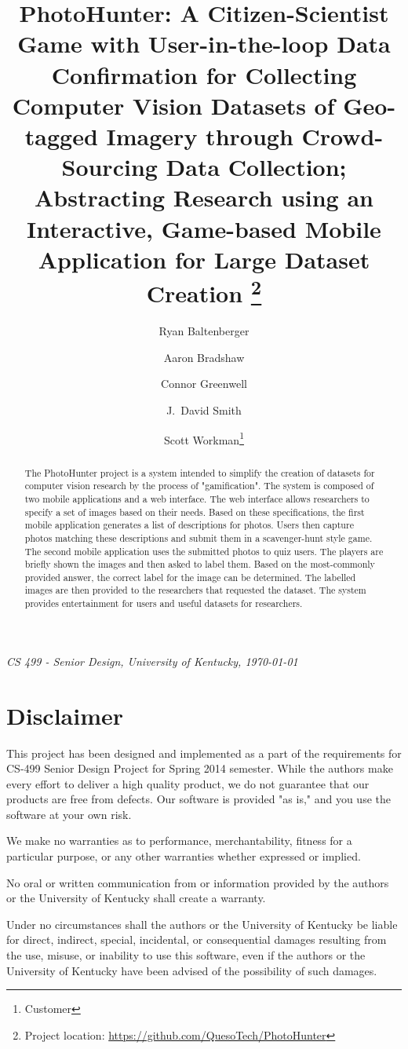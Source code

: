 \documentclass{article}
\title{PhotoHunter: A Citizen-Scientist Game with User-in-the-loop
  Data Confirmation for Collecting Computer Vision Datasets of
  Geo-tagged Imagery through Crowd-Sourcing Data Collection; Abstracting
  Research using an Interactive, Game-based Mobile Application for Large
  Dataset Creation
  \footnote{Project location:
    \url{https://github.com/QuesoTech/PhotoHunter}
  }
}
\author{
	Ryan Baltenberger \and
	Aaron Bradshaw \and
	Connor Greenwell \and
	J.\ David Smith \and
	Scott Workman\footnote{Customer}
}
\date{}
\begin{document}
\maketitle

\begin{center}
  \textit{CS 499 - Senior Design, University of Kentucky, \today}
\end{center}

\begin{abstract}
  The PhotoHunter project is a system intended to simplify the creation of
  datasets for computer vision research by the process of "gamification". The
  system is composed of two mobile applications and a web interface. The web
  interface allows researchers to specify a set of images based on their needs.
  Based on these specifications, the first mobile application generates a list of
  descriptions for photos. Users then capture photos matching these descriptions
  and submit them in a scavenger-hunt style game. The second mobile application
  uses the submitted photos to quiz users. The players are briefly shown the
  images and then asked to label them. Based on the most-commonly provided
  answer, the correct label for the image can be determined. The labelled images
  are then provided to the researchers that requested the dataset. The system
  provides entertainment for users and useful datasets for researchers.
\end{abstract}

\section{Disclaimer}
This project has been designed and implemented as a part of the requirements
for CS-499 Senior Design Project for Spring 2014 semester.  While the authors
make every effort to deliver a high quality product, we do not guarantee that
our products are free from defects.  Our software is provided "as is," and you
use the software at your own risk.

We make no warranties as to performance, merchantability, fitness for a
particular purpose, or any other warranties whether expressed or implied.

No oral or written communication from or information provided by the authors or
the University of Kentucky shall create a warranty.

Under no circumstances shall the authors or the University of Kentucky be
liable for direct, indirect, special, incidental, or consequential damages
resulting from the use, misuse, or inability to use this software, even if the
authors or the University of Kentucky have been advised of the possibility of
such damages.
\end{document}
